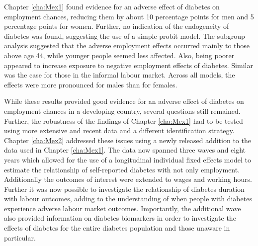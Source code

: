 Chapter \ref{cha:Mex1} found evidence for an adverse effect of diabetes on employment chances, reducing them by about 10 percentage points for men and 5 percentage points for women. Further, no indication of the endogeneity of diabetes was found, suggesting the use of a simple probit model. The subgroup analysis suggested that the adverse employment effects occurred mainly to those above age 44, while younger people seemed less affected. Also, being poorer appeared to increase exposure to negative employment effects of diabetes. Similar was the case for those in the informal labour market. Across all models, the effects were more pronounced for males than for females. 

While these results provided good evidence for an adverse effect of diabetes on employment chances in a developing country, several questions still remained. Further, the robustness of the findings of Chapter \ref{cha:Mex1} had to be tested using more extensive and recent data and a different identification strategy. Chapter \ref{cha:Mex2} addressed these issues using a newly released addition to the data used in Chapter \ref{cha:Mex1}. The data now spanned three waves and eight years which allowed for the use of a longitudinal individual fixed effects model to estimate the relationship of self-reported diabetes with not only employment. Additionally the outcomes of interest were extended to wages and working hours. Further it was now possible to investigate the relationship of diabetes duration with labour outcomes, adding to the understanding of when people with diabetes experience adverse labour market outcomes. Importantly, the additional wave also provided information on diabetes biomarkers in order to investigate the effects of diabetes for the entire diabetes population and those unaware in particular.

